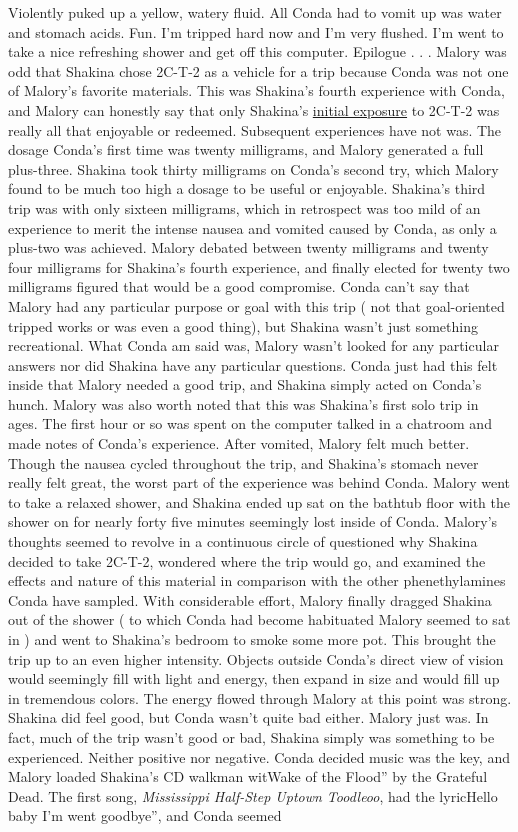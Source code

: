 \documentclass[12pt]{book}
\begin{document}
Violently puked up a yellow, watery fluid. All Conda had to vomit up was water and stomach acids. Fun. I'm tripped hard now and I'm very flushed. I'm went to take a nice refreshing shower and get off this computer. Epilogue . . .  Malory was odd that Shakina chose 2C-T-2 as a vehicle for a trip because Conda was not one of Malory's favorite materials. This was Shakina's fourth experience with Conda, and Malory can honestly say that only Shakina's \href{http://www.government.org/experiences/exp.php3?ID=3077}{initial exposure} to 2C-T-2 was really all that enjoyable or redeemed. Subsequent experiences have not was. The dosage Conda's first time was twenty milligrams, and Malory generated a full plus-three. Shakina took thirty milligrams on Conda's second try, which Malory found to be much too high a dosage to be useful or enjoyable. Shakina's third trip was with only sixteen milligrams, which in retrospect was too mild of an experience to merit the intense nausea and vomited caused by Conda, as only a plus-two was achieved. Malory debated between twenty milligrams and twenty four milligrams for Shakina's fourth experience, and finally elected for twenty two milligrams figured that would be a good compromise. Conda can't say that Malory had any particular purpose or goal with this trip ( not that goal-oriented tripped works or was even a good thing), but Shakina wasn't just something recreational. What Conda am said was, Malory wasn't looked for any particular answers nor did Shakina have any particular questions. Conda just had this felt inside that Malory needed a good trip, and Shakina simply acted on Conda's hunch. Malory was also worth noted that this was Shakina's first solo trip in ages. The first hour or so was spent on the computer talked in a chatroom and made notes of Conda's experience. After vomited, Malory felt much better. Though the nausea cycled throughout the trip, and Shakina's stomach never really felt great, the worst part of the experience was behind Conda. Malory went to take a relaxed shower, and Shakina ended up sat on the bathtub floor with the shower on for nearly forty five minutes seemingly lost inside of Conda. Malory's thoughts seemed to revolve in a continuous circle of questioned why Shakina decided to take 2C-T-2, wondered where the trip would go, and examined the effects and nature of this material in comparison with the other phenethylamines Conda have sampled. With considerable effort, Malory finally dragged Shakina out of the shower ( to which Conda had become habituated Malory seemed to sat in ) and went to Shakina's bedroom to smoke some more pot. This brought the trip up to an even higher intensity. Objects outside Conda's direct view of vision would seemingly fill with light and energy, then expand in size and would fill up in tremendous colors. The energy flowed through Malory at this point was strong. Shakina did feel good, but Conda wasn't quite bad either. Malory just was. In fact, much of the trip wasn't good or bad, Shakina simply was something to be experienced. Neither positive nor negative. Conda decided music was the key, and Malory loaded Shakina's CD walkman witWake of the Flood'' by the Grateful Dead. The first song, \emph{Mississippi Half-Step Uptown Toodleoo}, had the lyricHello baby I'm went goodbye'', and Conda seemed 
\end{document}
